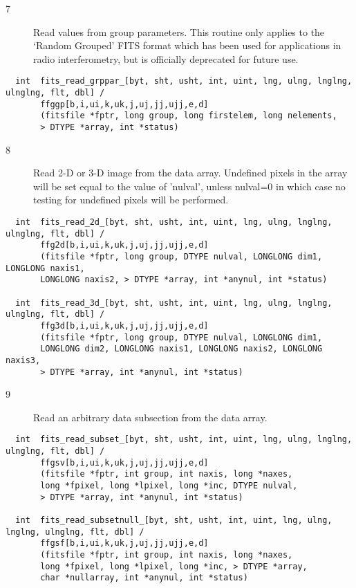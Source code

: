 \documentclass[11pt]{book}
\begin{document}
\begin{description}
\item[7 ] Read values from group parameters.  This routine only applies
    to the `Random Grouped' FITS format which has been used for
    applications in radio interferometry, but is officially deprecated
   for future use. \label{ffggpx}
\end{description}

\begin{verbatim}
  int  fits_read_grppar_[byt, sht, usht, int, uint, lng, ulng, lnglng, ulnglng, flt, dbl] /
       ffggp[b,i,ui,k,uk,j,uj,jj,ujj,e,d]
       (fitsfile *fptr, long group, long firstelem, long nelements,
       > DTYPE *array, int *status)
\end{verbatim}

\begin{description}
\item[8 ]  Read 2-D or 3-D image from the data array.  Undefined
     pixels in the array will be set equal to the value of 'nulval',
     unless nulval=0 in which case no testing for undefined pixels will
    be performed. \label{ffg2dx} \label{ffg3dx}
\end{description}

\begin{verbatim}
  int  fits_read_2d_[byt, sht, usht, int, uint, lng, ulng, lnglng, ulnglng, flt, dbl] /
       ffg2d[b,i,ui,k,uk,j,uj,jj,ujj,e,d]
       (fitsfile *fptr, long group, DTYPE nulval, LONGLONG dim1, LONGLONG naxis1,
       LONGLONG naxis2, > DTYPE *array, int *anynul, int *status)

  int  fits_read_3d_[byt, sht, usht, int, uint, lng, ulng, lnglng, ulnglng, flt, dbl] /
       ffg3d[b,i,ui,k,uk,j,uj,jj,ujj,e,d]
       (fitsfile *fptr, long group, DTYPE nulval, LONGLONG dim1,
       LONGLONG dim2, LONGLONG naxis1, LONGLONG naxis2, LONGLONG naxis3,
       > DTYPE *array, int *anynul, int *status)
\end{verbatim}

\begin{description}
\item[9 ]   Read an arbitrary data subsection from the data array.
      \label{ffgsvx} \label{ffgsfx}
\end{description}

\begin{verbatim}
  int  fits_read_subset_[byt, sht, usht, int, uint, lng, ulng, lnglng, ulnglng, flt, dbl] /
       ffgsv[b,i,ui,k,uk,j,uj,jj,ujj,e,d]
       (fitsfile *fptr, int group, int naxis, long *naxes,
       long *fpixel, long *lpixel, long *inc, DTYPE nulval,
       > DTYPE *array, int *anynul, int *status)

  int  fits_read_subsetnull_[byt, sht, usht, int, uint, lng, ulng, lnglng, ulnglng, flt, dbl] /
       ffgsf[b,i,ui,k,uk,j,uj,jj,ujj,e,d]
       (fitsfile *fptr, int group, int naxis, long *naxes,
       long *fpixel, long *lpixel, long *inc, > DTYPE *array,
       char *nullarray, int *anynul, int *status)
\end{verbatim}

\end{document}
